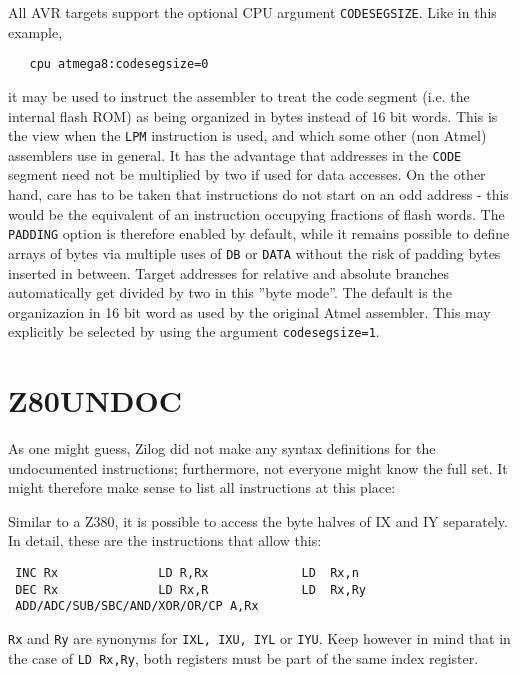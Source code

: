 \documentclass[12pt,twoside]{report}
\newcommand{\tty}[1]{{\tt #1}}
\begin{document}
All AVR targets support the optional CPU argument {\tt CODESEGSIZE}.
Like in this example,
\begin{verbatim}
   cpu atmega8:codesegsize=0
\end{verbatim}
it may be used to instruct the assembler to treat the code segment (i.e.
the internal flash ROM) as being organized in bytes instead of 16 bit words.
This is the view when the {\tt LPM} instruction is used, and which some other
(non Atmel) assemblers use in general.  It has the advantage that addresses 
in the {\tt CODE} segment need not be multiplied by two if used for data
accesses.  On the other hand, care has to be taken that instructions do
not start on an odd address - this would be the equivalent of an instruction
occupying fractions of flash words.  The {\tt PADDING} option is therefore
enabled by default, while it remains possible to define arrays of bytes via
multiple uses of {\tt DB} or {\tt DATA} without the risk of padding bytes
inserted in between.  Target addresses for relative and absolute branches 
automatically get divided by two in this ''byte mode''.  The default is the
organizazion in 16 bit word as used by the original Atmel assembler.  This
may explicitly be selected by using the argument \verb!codesegsize=1!.


\section{Z80UNDOC}

As one might guess, Zilog did not make any syntax definitions for the
undocumented instructions; furthermore, not everyone might know the
full set.  It might therefore make sense to list all instructions at
this place:

Similar to a Z380, it is possible to access the byte halves of IX and
IY separately.  In detail, these are the instructions that allow
this:
\begin{verbatim}
 INC Rx              LD R,Rx             LD  Rx,n
 DEC Rx              LD Rx,R             LD  Rx,Ry
 ADD/ADC/SUB/SBC/AND/XOR/OR/CP A,Rx
\end{verbatim}
\tty{Rx} and \tty{Ry} are synonyms for \tty{IXL, IXU, IYL} or \tty{IYU}.
Keep however in mind that in the case of \tty{LD  Rx,Ry}, both registers
must be part of the same index register.
\end{document}

